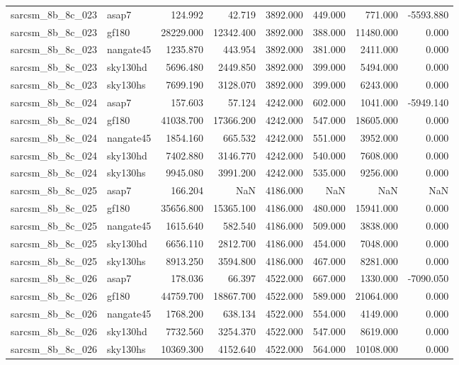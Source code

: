 \begin{tabular}{llrrrrrr}
sarcsm\_8b\_8c\_023 & asap7 & 124.992 & 42.719 & 3892.000 & 449.000 & 771.000 & -5593.880 \\
sarcsm\_8b\_8c\_023 & gf180 & 28229.000 & 12342.400 & 3892.000 & 388.000 & 11480.000 & 0.000 \\
sarcsm\_8b\_8c\_023 & nangate45 & 1235.870 & 443.954 & 3892.000 & 381.000 & 2411.000 & 0.000 \\
sarcsm\_8b\_8c\_023 & sky130hd & 5696.480 & 2449.850 & 3892.000 & 399.000 & 5494.000 & 0.000 \\
sarcsm\_8b\_8c\_023 & sky130hs & 7699.190 & 3128.070 & 3892.000 & 399.000 & 6243.000 & 0.000 \\
sarcsm\_8b\_8c\_024 & asap7 & 157.603 & 57.124 & 4242.000 & 602.000 & 1041.000 & -5949.140 \\
sarcsm\_8b\_8c\_024 & gf180 & 41038.700 & 17366.200 & 4242.000 & 547.000 & 18605.000 & 0.000 \\
sarcsm\_8b\_8c\_024 & nangate45 & 1854.160 & 665.532 & 4242.000 & 551.000 & 3952.000 & 0.000 \\
sarcsm\_8b\_8c\_024 & sky130hd & 7402.880 & 3146.770 & 4242.000 & 540.000 & 7608.000 & 0.000 \\
sarcsm\_8b\_8c\_024 & sky130hs & 9945.080 & 3991.200 & 4242.000 & 535.000 & 9256.000 & 0.000 \\
sarcsm\_8b\_8c\_025 & asap7 & 166.204 & NaN & 4186.000 & NaN & NaN & NaN \\
sarcsm\_8b\_8c\_025 & gf180 & 35656.800 & 15365.100 & 4186.000 & 480.000 & 15941.000 & 0.000 \\
sarcsm\_8b\_8c\_025 & nangate45 & 1615.640 & 582.540 & 4186.000 & 509.000 & 3838.000 & 0.000 \\
sarcsm\_8b\_8c\_025 & sky130hd & 6656.110 & 2812.700 & 4186.000 & 454.000 & 7048.000 & 0.000 \\
sarcsm\_8b\_8c\_025 & sky130hs & 8913.250 & 3594.800 & 4186.000 & 467.000 & 8281.000 & 0.000 \\
sarcsm\_8b\_8c\_026 & asap7 & 178.036 & 66.397 & 4522.000 & 667.000 & 1330.000 & -7090.050 \\
sarcsm\_8b\_8c\_026 & gf180 & 44759.700 & 18867.700 & 4522.000 & 589.000 & 21064.000 & 0.000 \\
sarcsm\_8b\_8c\_026 & nangate45 & 1768.200 & 638.134 & 4522.000 & 554.000 & 4149.000 & 0.000 \\
sarcsm\_8b\_8c\_026 & sky130hd & 7732.560 & 3254.370 & 4522.000 & 547.000 & 8619.000 & 0.000 \\
sarcsm\_8b\_8c\_026 & sky130hs & 10369.300 & 4152.640 & 4522.000 & 564.000 & 10108.000 & 0.000 \\

\end{tabular}
